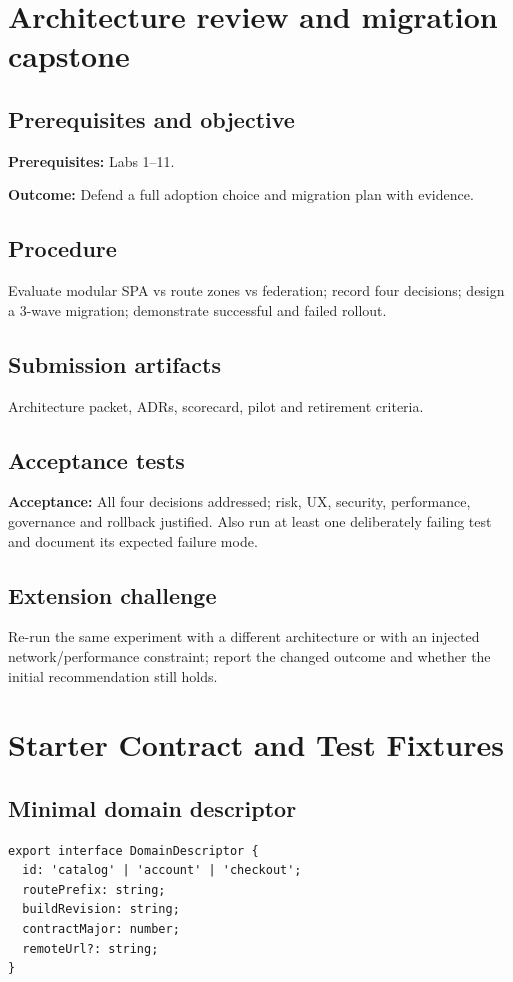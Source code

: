 \documentclass[11pt,letterpaper,oneside]{report}
\newcommand{\criterion}[1]{\textbf{Acceptance:} #1}
\begin{document}
\chapter{Architecture review and migration capstone}
\section{Prerequisites and objective}
\textbf{Prerequisites:} Labs 1--11.\par
\textbf{Outcome:} Defend a full adoption choice and migration plan with evidence.
\section{Procedure}
Evaluate modular SPA vs route zones vs federation; record four decisions; design a 3-wave migration; demonstrate successful and failed rollout.
\section{Submission artifacts}
Architecture packet, ADRs, scorecard, pilot and retirement criteria.
\section{Acceptance tests}
\criterion{All four decisions addressed; risk, UX, security, performance, governance and rollback justified.} Also run at least one deliberately failing test and document its expected failure mode.
\section{Extension challenge}
Re-run the same experiment with a different architecture or with an injected network/performance constraint; report the changed outcome and whether the initial recommendation still holds.

\chapter*{Starter Contract and Test Fixtures}
\section*{Minimal domain descriptor}
\begin{lstlisting}[caption={Illustrative descriptor}]
export interface DomainDescriptor {
  id: 'catalog' | 'account' | 'checkout';
  routePrefix: string;
  buildRevision: string;
  contractMajor: number;
  remoteUrl?: string;
}
\end{lstlisting}
\end{document}
